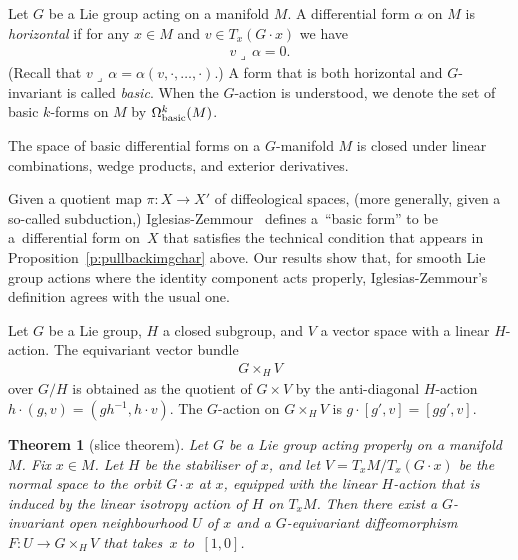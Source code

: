 \documentclass[11pt]{article}
\numberwithin{equation}{section}
\newtheorem{Theorem}{Theorem}[section]
\newcommand{\hook}{{\lrcorner\,}} %
\begin{document}
\begin{Definition} \label{d:basic form}
Let $G$ be a Lie group acting on a manifold $M$.
A dif\/ferential form $\alpha$ on $M$ is \emph{horizontal}
if for any $x \in M$ and $v \in T_x(G\cdot x)$ we have
\begin{gather*} v \hook \alpha = 0.\end{gather*}
(Recall that $v\hook\alpha=\alpha(v,\cdot,\dots,\cdot)$.)
A form that is both horizontal and $G$-invariant is called \emph{basic}.
When the $G$-action is understood,
we denote the set of basic $k$-forms on $M$ by $\Omega^k_{\rm basic}(M)$.
\end{Definition}

\begin{Remark} \label{r:wedge and d of basic}
The space of basic dif\/ferential forms on a $G$-manifold $M$
is closed under linear combinations, wedge products,
and exterior derivatives.
\end{Remark}

\begin{Remark}
Given a quotient map $\pi \colon X \to X'$ of dif\/feological spaces,
(more generally, given a so-called subduction,)
Iglesias-Zemmour~\cite[Section~6.38]{iglesias}
def\/ines a~``basic form'' to be a~dif\/ferential form on~$X$
that satisf\/ies the technical condition that appears in
Proposition~\ref{p:pullbackimgchar} above.
Our results show that, for smooth Lie group actions
where the identity component acts properly,
Iglesias-Zemmour's def\/inition agrees with the usual one.
\end{Remark}

Let $G$ be a Lie group, $H$ a closed subgroup, and $V$ a vector space
with a linear $H$-action. The equivariant vector bundle
\begin{gather*} G \times_H V \end{gather*}
over $G/H$ is obtained as the quotient of $G \times V$
by the anti-diagonal $H$-action $h \cdot (g,v) = (g h^{-1} , h \cdot v)$.
The $G$-action on $G\times_H V$ is $g\cdot[g',v]=[gg',v]$.

\begin{Theorem}[slice theorem]
\label{t:slice theorem}
Let $G$ be a Lie group acting properly on a manifold $M$. Fix $x\in M$.
Let $H$ be the stabiliser of $x$, and let $V = T_x M / T_x(G\cdot x)$
be the normal space to the orbit $G\cdot x$ at $x$,
equipped with the linear $H$-action that is induced
by the linear isotropy action of $H$ on $T_xM$.
Then there exist a $G$-invariant open neighbourhood $U$ of $x$
and a $G$-equivariant diffeomorphism $F\colon U\to G\times_H V$
that takes~$x$ to~$[1,0]$.
\end{Theorem}
\end{document}
